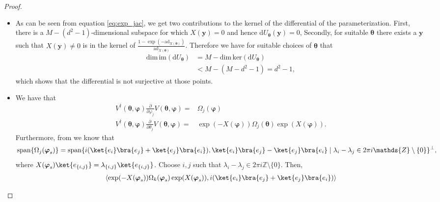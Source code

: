\documentclass{article}
\renewcommand{\vec}[1]{\ensuremath{\boldsymbol{#1}}}
\begin{document}
\begin{proof}
    \noindent
    \begin{itemize}
        \item [(a)] As can be seen from equation \eqref{eq:exp_jac}, we get two contributions to the kernel of the differential of the parameterization.
        First, there is a \(M - (d^2-1)\)-dimensional subspace for which \(X(\vec{y})=0\) and hence \(\mathrm{d}U_{\vec{\theta}}(\vec{y}) = 0\), Secondly, for suitable \(\vec{\theta}\) there exists a \(\vec{y}\) such that \(X(\vec{y}) \neq 0\) is in the kernel of \(\frac{1-\exp(-\mathrm{ad}_{X(\vec{\theta})})}{\mathrm{ad}_{X(\vec{\theta})}}\).
        Therefore we have for suitable choices of \(\vec{\theta}\) that
        \begin{align}
            \mathrm{dim}\,\mathrm{im}\left(\mathrm{d}U_{\vec{\theta}}\right) & = M - \mathrm{dim}\,\mathrm{ker}\left(\mathrm{d}U_{\vec{\theta}}\right) \nonumber \\
            & < M - (M-d^2-1) = d^2-1,
        \end{align}
        which shows that the differential is not surjective at those points.
        \item[(b)] We have that
        \begin{align}
            V^\dagger(\vec{\theta}, \vec{\varphi}) \frac{\partial}{\partial \varphi_j}V(\vec{\theta}, \vec{\varphi}) = & \Omega_j(\vec{\varphi}) \\
            V^\dagger(\vec{\theta}, \vec{\varphi}) \frac{\partial}{\partial \theta_j}V(\vec{\theta}, \vec{\varphi}) = & \exp(-X(\vec{\varphi})) \Omega_j(\vec{\theta}) \exp(X(\vec{\varphi})).
        \end{align}
        Furthermore, from  we know that
        \begin{equation}
                \mathrm{span}\{\Omega_j(\vec{\varphi}_s)\} = \mathrm{span}\{i(\ket{e_i}\bra{e_j} + \ket{e_j}\bra{e_i}), \ket{e_i}\bra{e_j} - \ket{e_j}\bra{e_i} \mid  \lambda_i - \lambda_j \in 2\pi i \mathds{Z} \setminus \{0\}\}^\perp,
        \end{equation}
        where \(X(\vec{\varphi}_s)\ket{e_{\{i,j\}}} = \lambda_{\{i,j\}} \ket{e_{\{i,j\}}}\).
        Choose \(i,j\) such that \(\lambda_i - \lambda_j \in 2\pi i \mathds{Z} \setminus \{0\}\).
        Then,
        \begin{align}
            & \langle \exp(-X(\vec{\varphi}_s)) \Omega_k(\vec{\varphi}_s) \exp(X(\vec{\varphi}_s)), i(\ket{e_i}\bra{e_j} + \ket{e_j}\bra{e_i}) \rangle \nonumber \\

\end{align}
\end{itemize}
\end{proof}
\end{document}
